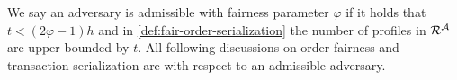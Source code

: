 We say an adversary \adv is admissible with fairness parameter $\varphi$ if it holds that $t < (2\varphi - 1)h$ and in \cref{def:fair-order-serialization} the number of profiles in $\mathcal{R}^\mathcal{A}$ are upper-bounded by $t$.
%
All following discussions on order fairness and transaction serialization are with respect to an admissible adversary.
